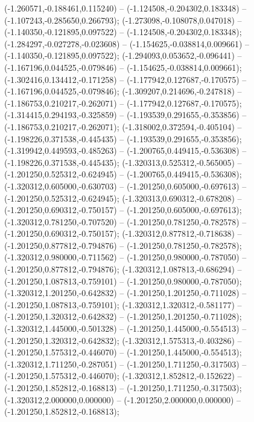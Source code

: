  (-1.260571,-0.188461,0.115240) -- (-1.124508,-0.204302,0.183348) -- (-1.107243,-0.285650,0.266793);
 (-1.273098,-0.108078,0.047018) -- (-1.140350,-0.121895,0.097522) -- (-1.124508,-0.204302,0.183348);
 (-1.284297,-0.027278,-0.023608) -- (-1.154625,-0.038814,0.009661) -- (-1.140350,-0.121895,0.097522);
 (-1.294093,0.053652,-0.096441) -- (-1.167196,0.044525,-0.079846) -- (-1.154625,-0.038814,0.009661);
 (-1.302416,0.134412,-0.171258) -- (-1.177942,0.127687,-0.170575) -- (-1.167196,0.044525,-0.079846);
 (-1.309207,0.214696,-0.247818) -- (-1.186753,0.210217,-0.262071) -- (-1.177942,0.127687,-0.170575);
 (-1.314415,0.294193,-0.325859) -- (-1.193539,0.291655,-0.353856) -- (-1.186753,0.210217,-0.262071);
 (-1.318002,0.372594,-0.405104) -- (-1.198226,0.371538,-0.445435) -- (-1.193539,0.291655,-0.353856);
 (-1.319942,0.449593,-0.485263) -- (-1.200765,0.449415,-0.536308) -- (-1.198226,0.371538,-0.445435);
 (-1.320313,0.525312,-0.565005) -- (-1.201250,0.525312,-0.624945) -- (-1.200765,0.449415,-0.536308);
 (-1.320312,0.605000,-0.630703) -- (-1.201250,0.605000,-0.697613) -- (-1.201250,0.525312,-0.624945);
 (-1.320313,0.690312,-0.678208) -- (-1.201250,0.690312,-0.750157) -- (-1.201250,0.605000,-0.697613);
 (-1.320312,0.781250,-0.707520) -- (-1.201250,0.781250,-0.782578) -- (-1.201250,0.690312,-0.750157);
 (-1.320312,0.877812,-0.718638) -- (-1.201250,0.877812,-0.794876) -- (-1.201250,0.781250,-0.782578);
 (-1.320312,0.980000,-0.711562) -- (-1.201250,0.980000,-0.787050) -- (-1.201250,0.877812,-0.794876);
 (-1.320312,1.087813,-0.686294) -- (-1.201250,1.087813,-0.759101) -- (-1.201250,0.980000,-0.787050);
 (-1.320312,1.201250,-0.642832) -- (-1.201250,1.201250,-0.711028) -- (-1.201250,1.087813,-0.759101);
 (-1.320312,1.320312,-0.581177) -- (-1.201250,1.320312,-0.642832) -- (-1.201250,1.201250,-0.711028);
 (-1.320312,1.445000,-0.501328) -- (-1.201250,1.445000,-0.554513) -- (-1.201250,1.320312,-0.642832);
 (-1.320312,1.575313,-0.403286) -- (-1.201250,1.575312,-0.446070) -- (-1.201250,1.445000,-0.554513);
 (-1.320312,1.711250,-0.287051) -- (-1.201250,1.711250,-0.317503) -- (-1.201250,1.575312,-0.446070);
 (-1.320312,1.852812,-0.152622) -- (-1.201250,1.852812,-0.168813) -- (-1.201250,1.711250,-0.317503);
 (-1.320312,2.000000,0.000000) -- (-1.201250,2.000000,0.000000) -- (-1.201250,1.852812,-0.168813);
